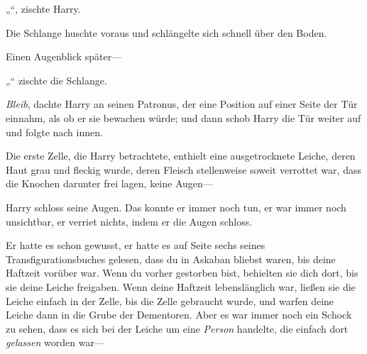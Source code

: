 „“, zischte Harry.

Die Schlange huschte voraus und schlängelte sich schnell über den Boden.

Einen Augenblick später—

„“ zischte die Schlange.

\emph{Bleib}, dachte Harry an seinen Patronus, der eine Position auf einer Seite der Tür einnahm, als ob er sie bewachen würde; und dann schob Harry die Tür weiter auf und folgte nach innen.

Die erste Zelle, die Harry betrachtete, enthielt eine ausgetrocknete Leiche, deren Haut grau und fleckig wurde, deren Fleisch stellenweise soweit verrottet war, dass die Knochen darunter frei lagen, keine Augen—

Harry schloss seine Augen. Das konnte er immer noch tun, er war immer noch unsichtbar, er verriet nichts, indem er die Augen schloss.

Er hatte es schon gewusst, er hatte es auf Seite sechs seines Transfigurationsbuches gelesen, dass du in Askaban bliebst waren, bis deine Haftzeit vorüber war. Wenn du vorher gestorben bist, behielten sie dich dort, bis sie deine Leiche freigaben. Wenn deine Haftzeit lebenslänglich war, ließen sie die Leiche einfach in der Zelle, bis die Zelle gebraucht wurde, und warfen deine Leiche dann in die Grube der Dementoren. Aber es war immer noch ein Schock zu sehen, dass es sich bei der Leiche um eine \emph{Person} handelte, die einfach dort \emph{gelassen} worden war—

